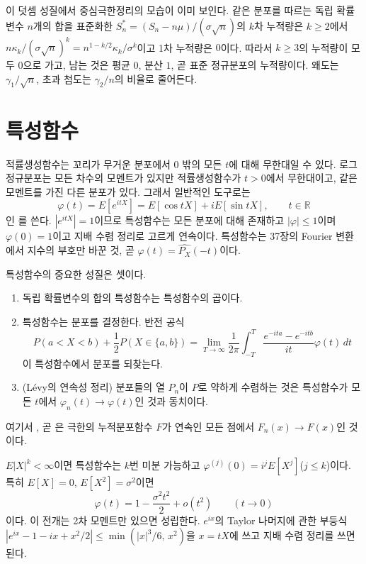 이 덧셈 성질에서 중심극한정리의 모습이 이미 보인다. 같은 분포를 따르는 독립 확률변수 $n$개의 합을 표준화한 $S_n^\ast=(S_n-n\mu)/(\sigma\sqrt n)$의 $k$차 누적량은 $k\ge2$에서 $n\kappa_k/(\sigma\sqrt n)^k=n^{1-k/2}\kappa_k/\sigma^k$이고 1차 누적량은 $0$이다. 따라서 $k\ge3$의 누적량이 모두 $0$으로 가고, 남는 것은 평균 $0$, 분산 $1$, 곧 표준 정규분포의 누적량이다. 왜도는 $\gamma_1/\sqrt n$, 초과 첨도는 $\gamma_2/n$의 비율로 줄어든다.

\section{특성함수}
\label{sec:characteristic-function}

적률생성함수는 꼬리가 무거운 분포에서 $0$ 밖의 모든 $t$에 대해 무한대일 수 있다. 로그정규분포는 모든 차수의 모멘트가 있지만 적률생성함수가 $t>0$에서 무한대이고, 같은 모멘트를 가진 다른 분포가 있다. 그래서 일반적인 도구로는
\[
\varphi(t)=E[e^{itX}]=E[\cos tX]+iE[\sin tX],\qquad t\in\mathbb R
\]
인 를 쓴다. $|e^{itX}|=1$이므로 특성함수는 모든 분포에 대해 존재하고 $|\varphi|\le1$이며 $\varphi(0)=1$이고 지배 수렴 정리로 고르게 연속이다. 특성함수는 37장의 Fourier 변환에서 지수의 부호만 바꾼 것, 곧 $\varphi(t)=\widehat{P_X}(-t)$이다.

특성함수의 중요한 성질은 셋이다.
\begin{enumerate}
\item 독립 확률변수의 합의 특성함수는 특성함수의 곱이다.
\item 특성함수는 분포를 결정한다. 반전 공식
\[
P(a<X<b)+\frac12P(X\in\{a,b\})=\lim_{T\to\infty}\frac1{2\pi}\int_{-T}^T\frac{e^{-ita}-e^{-itb}}{it}\varphi(t)\,dt
\]
이 특성함수에서 분포를 되찾는다\cite{billingsley1995}.
\item (Lévy의 연속성 정리) 분포들의 열 $P_n$이 $P$로 약하게 수렴하는 것은 특성함수가 모든 $t$에서 $\varphi_n(t)\to\varphi(t)$인 것과 동치이다\cite{billingsley1995}.
\end{enumerate}
여기서 , 곧 은 극한의 누적분포함수 $F$가 연속인 모든 점에서 $F_n(x)\to F(x)$인 것이다.

$E|X|^k<\infty$이면 특성함수는 $k$번 미분 가능하고 $\varphi^{(j)}(0)=i^jE[X^j]$($j\le k$)이다. 특히 $E[X]=0$, $E[X^2]=\sigma^2$이면
\begin{equation}
\varphi(t)=1-\frac{\sigma^2t^2}2+o(t^2)\qquad(t\to0)
\label{eq:cf-taylor}
\end{equation}
이다. 이 전개는 2차 모멘트만 있으면 성립한다. $e^{ix}$의 Taylor 나머지에 관한 부등식 $|e^{ix}-1-ix+x^2/2|\le\min(|x|^3/6,\,x^2)$을 $x=tX$에 쓰고 지배 수렴 정리를 쓰면 된다.

